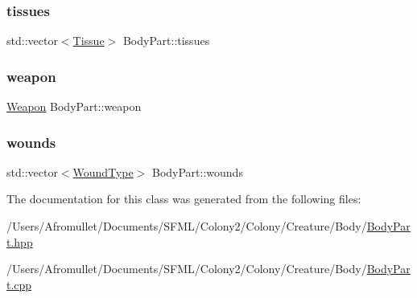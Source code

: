 \mbox{\label{class_body_part_a8ae4510b40d983d1682f726c0aaed0a3}} 
\subsubsection{\texorpdfstring{tissues}{tissues}}
{\footnotesize\ttfamily std\+::vector$<$\mbox{\hyperlink{class_tissue}{Tissue}}$>$ Body\+Part\+::tissues\hspace{0.3cm}{\ttfamily [private]}}

\mbox{\label{class_body_part_a3d2dd4c1af200c1deb2dbf38b660f476}} 
\subsubsection{\texorpdfstring{weapon}{weapon}}
{\footnotesize\ttfamily \mbox{\hyperlink{class_weapon}{Weapon}} Body\+Part\+::weapon\hspace{0.3cm}{\ttfamily [private]}}

\mbox{\label{class_body_part_a22bf733f773503bd1fabee639371309c}} 
\subsubsection{\texorpdfstring{wounds}{wounds}}
{\footnotesize\ttfamily std\+::vector$<$\mbox{\hyperlink{_enum_types_8hpp_a585daaeecd1f9f1350c24bf0081a734e}{Wound\+Type}}$>$ Body\+Part\+::wounds\hspace{0.3cm}{\ttfamily [private]}}



The documentation for this class was generated from the following files\+:\begin{DoxyCompactItemize}
\item 
/\+Users/\+Afromullet/\+Documents/\+S\+F\+M\+L/\+Colony2/\+Colony/\+Creature/\+Body/\mbox{\hyperlink{_body_part_8hpp}{Body\+Part.\+hpp}}\item 
/\+Users/\+Afromullet/\+Documents/\+S\+F\+M\+L/\+Colony2/\+Colony/\+Creature/\+Body/\mbox{\hyperlink{_body_part_8cpp}{Body\+Part.\+cpp}}\end{DoxyCompactItemize}
